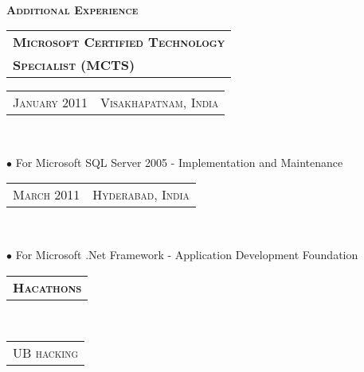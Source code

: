 \documentclass[10pt,a4paper,oneside]{article}
\begin{document}
\begin{minipage}[t]{0.33\textwidth}
{        }
        \vspace{10pt}\\
        \textcolor{light-gray}{\textbf{\large A\textsc{dditional} E\textsc{xperience}}}
        \vspace{10pt}\\
        \begin{tabular}{l}
            \textbf{\normalsize M\textsc{icrosoft} C\textsc{ertified} T\textsc{echnology}}\\
            {\normalsize \textbf{S\textsc{pecialist} (MCTS)}}
        \end{tabular}
        \vspace{2pt}
        \textcolor{light-gray}{
            \begin{tabular}{c|c}
                {\small J\textsc{anuary 2011}}
                &{\small V\textsc{isakhapatnam}, I\textsc{ndia}}
            \end{tabular}
        }\\
        \vspace{-12pt}
        \begin{adjustwidth}{7pt}{0pt}
            {\footnotesize $\bullet$ For Microsoft SQL Server 2005 - Implementation and Maintenance}\\
        \end{adjustwidth}
        \vspace{-6pt} 
        \textcolor{light-gray}{
            \begin{tabular}{c|c}
                {\small M\textsc{arch 2011}}
                &{\small H\textsc{yderabad}, I\textsc{ndia}}
            \end{tabular}
        }\\
        \vspace{-12pt}
        \begin{adjustwidth}{7pt}{0pt}
        {\footnotesize $\bullet$ For Microsoft .Net Framework - Application Development Foundation}\\
        \end{adjustwidth}
        \begin{tabular}{c}
            \textbf{\normalsize H\textsc{acathons}}
        \end{tabular}\\
        \begin{tabular}{c}
            {\small UB\textsc{ hacking}}
        \end{tabular}\\
        \textcolor{light-gray}{
            \begin{tabular}{c|c}

\end{tabular}}
\end{minipage}
\end{document}
